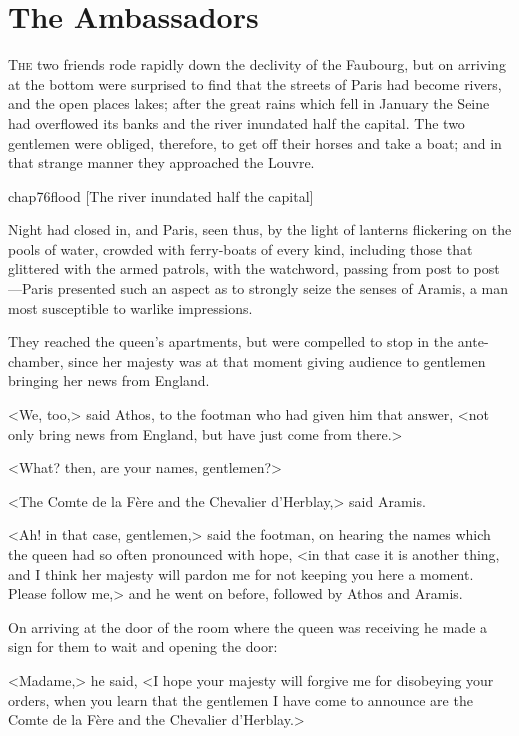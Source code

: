 \chapter{The Ambassadors}

 \lettrine{T}{he} two friends rode rapidly down the declivity of the Faubourg, but on arriving at the bottom were surprised to find that the streets of Paris had become rivers, and the open places lakes; after the great rains which fell in January the Seine had overflowed its banks and the river inundated half the capital. The two gentlemen were obliged, therefore, to get off their horses and take a boat; and in that strange manner they approached the Louvre.

\begin{bwbigpic}
	[\basicscale] 
	{chap76flood}
	[The river inundated half the capital]
\end{bwbigpic}

Night had closed in, and Paris, seen thus, by the light of lanterns flickering on the pools of water, crowded with ferry-boats of every kind, including those that glittered with the armed patrols, with the watchword, passing from post to post—Paris presented such an aspect as to strongly seize the senses of Aramis, a man most susceptible to warlike impressions.

They reached the queen's apartments, but were compelled to stop in the ante-chamber, since her majesty was at that moment giving audience to gentlemen bringing her news from England.

<We, too,> said Athos, to the footman who had given him that answer, <not only bring news from England, but have just come from there.>

<What? then, are your names, gentlemen?>

<The Comte de la Fère and the Chevalier d'Herblay,> said Aramis.

<Ah! in that case, gentlemen,> said the footman, on hearing the names which the queen had so often pronounced with hope, <in that case it is another thing, and I think her majesty will pardon me for not keeping you here a moment. Please follow me,> and he went on before, followed by Athos and Aramis.

On arriving at the door of the room where the queen was receiving he made a sign for them to wait and opening the door:

<Madame,> he said, <I hope your majesty will forgive me for disobeying your orders, when you learn that the gentlemen I have come to announce are the Comte de la Fère and the Chevalier d'Herblay.>

